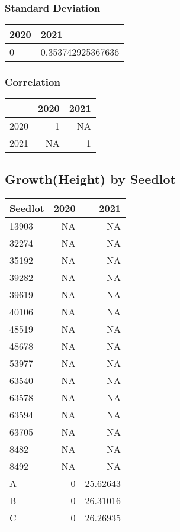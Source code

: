 \documentclass[
]{article}
\begin{document}
\hypertarget{standard-deviation-3}{%
\subsubsection{Standard Deviation}\label{standard-deviation-3}}

\begin{table}[H]
\centering
\begin{tabular}{l|l}
\hline
2020 & 2021\\
\hline
0 & 0.353742925367636\\
\hline
\end{tabular}
\end{table}

\hypertarget{correlation-3}{%
\subsubsection{Correlation}\label{correlation-3}}

\begin{table}[H]
\centering
\begin{tabular}{l|r|r}
\hline
  & 2020 & 2021\\
\hline
2020 & 1 & NA\\
\hline
2021 & NA & 1\\
\hline
\end{tabular}
\end{table}

\hypertarget{growthheight-by-seedlot}{%
\subsection{Growth(Height) by Seedlot}\label{growthheight-by-seedlot}}

\begin{table}[H]
\centering
\begin{tabular}{l|r|r}
\hline
Seedlot & 2020 & 2021\\
\hline
13903 & NA & NA\\
\hline
32274 & NA & NA\\
\hline
35192 & NA & NA\\
\hline
39282 & NA & NA\\
\hline
39619 & NA & NA\\
\hline
40106 & NA & NA\\
\hline
48519 & NA & NA\\
\hline
48678 & NA & NA\\
\hline
53977 & NA & NA\\
\hline
63540 & NA & NA\\
\hline
63578 & NA & NA\\
\hline
63594 & NA & NA\\
\hline
63705 & NA & NA\\
\hline
8482 & NA & NA\\
\hline
8492 & NA & NA\\
\hline
A & 0 & 25.62643\\
\hline
B & 0 & 26.31016\\
\hline
C & 0 & 26.26935\\
\hline
\end{tabular}
\end{table}
\end{document}
